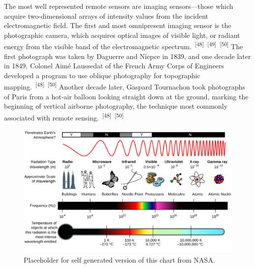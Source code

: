 \documentclass{article}
\begin{document}
\par{The most well represented remote sensors are imaging sensors---those which acquire two-dimensional arrays of intensity values from the incident electromagnetic field. The first and most omnipresent imaging sensor is the photographic camera, which acquires optical images of visible light, or radiant energy from the visible band of the electromagnetic spectrum.~\textsuperscript{[48]}~\textsuperscript{[49]}~\textsuperscript{[50]} The first photograph was taken by Daguerre and Niepce in 1839, and one decade later in 1849, Colonel Aimé Laussedat of the French Army Corps of Engineers developed a program to use oblique photography for topographic mapping.~\textsuperscript{[48]}~\textsuperscript{[50]}  Another decade later, Gaspard Tournachon took photographs of Paris from a hot-air balloon looking straight down at the ground, marking the beginning of vertical airborne photography, the technique most commonly associated with remote sensing.~\textsuperscript{[48]}~\textsuperscript{[50]}}

\begin{figure}
    \centering
    \includegraphics[width=1\linewidth]{images/em-spectrum.png}
    \caption{Placeholder for self generated version of this chart from NASA.}
    \label{figure12}
\end{figure}
\end{document}
